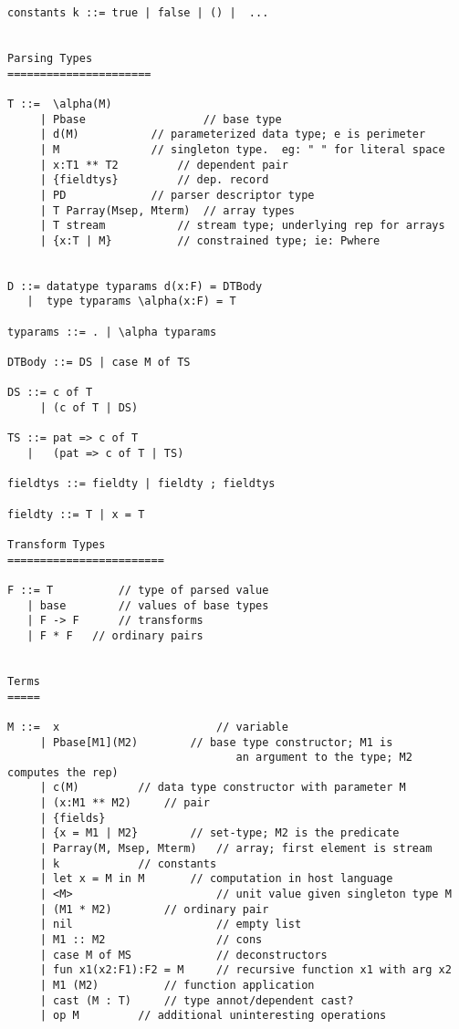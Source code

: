 \begin{verbatim}
constants k ::= true | false | () |  ...


Parsing Types
======================

T ::=  \alpha(M)
     | Pbase                  // base type
     | d(M)		      // parameterized data type; e is perimeter
     | M		      // singleton type.  eg: " " for literal space
     | x:T1 ** T2	      // dependent pair
     | {fieldtys}	      // dep. record
     | PD		      // parser descriptor type
     | T Parray(Msep, Mterm)  // array types
     | T stream		      // stream type; underlying rep for arrays
     | {x:T | M}	      // constrained type; ie: Pwhere


D ::= datatype typarams d(x:F) = DTBody
   |  type typarams \alpha(x:F) = T

typarams ::= . | \alpha typarams

DTBody ::= DS | case M of TS

DS ::= c of T
     | (c of T | DS)

TS ::= pat => c of T
   |   (pat => c of T | TS)

fieldtys ::= fieldty | fieldty ; fieldtys

fieldty ::= T | x = T

Transform Types
========================

F ::= T          // type of parsed value
   | base        // values of base types
   | F -> F      // transforms
   | F * F	 // ordinary pairs


Terms
=====

M ::=  x                        // variable
     | Pbase[M1](M2)		// base type constructor; M1 is
                                   an argument to the type; M2 computes the rep)
     | c(M)			// data type constructor with parameter M
     | (x:M1 ** M2)		// pair
     | {fields}
     | {x = M1 | M2}		// set-type; M2 is the predicate
     | Parray(M, Msep, Mterm)   // array; first element is stream
     | k			// constants
     | let x = M in M		// computation in host language
     | <M>                      // unit value given singleton type M
     | (M1 * M2)		// ordinary pair
     | nil                      // empty list
     | M1 :: M2                 // cons
     | case M of MS             // deconstructors
     | fun x1(x2:F1):F2 = M     // recursive function x1 with arg x2
     | M1 (M2)			// function application
     | cast (M : T)		// type annot/dependent cast?
     | op M			// additional uninteresting operations
     

\end{verbatim}
